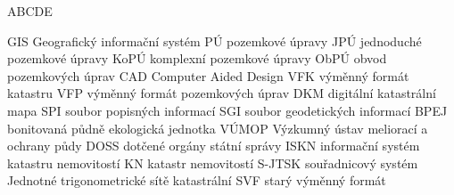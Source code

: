 
\begin{seznamzkratek}{ABCDE}

	      {GIS}
	      {Geografický informační systém}
	      {PÚ}
	      {pozemkové úpravy}
	      {JPÚ}
	      {jednoduché pozemkové úpravy}
	      {KoPÚ}
	      {komplexní pozemkové úpravy}
	      {ObPÚ}
	      {obvod pozemkových úprav}
	      {CAD}
	      {Computer Aided Design}
	      {VFK}
	      {výměnný formát katastru}
	      {VFP}
	      {výměnný formát pozemkových úprav}
	      {DKM}
	      {digitální katastrální mapa}
	      {SPI}
	      {soubor popisných informací}
	      {SGI}
	      {soubor geodetických informací}
	      {BPEJ}
	      {bonitovaná půdně ekologická jednotka}
	      {VÚMOP}
	      {Výzkumný ústav meliorací a ochrany půdy}
	      {DOSS}
	      {dotčené orgány státní správy}
	      {ISKN}
	      {informační systém katastru nemovitostí}
	      {KN}
	      {katastr nemovitostí}
	      {S-JTSK}
	      {souřadnicový systém Jednotné trigonometrické sítě katastrální}
	      {SVF}
	      {starý výměnný formát}
	      
\end{seznamzkratek}